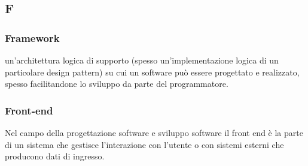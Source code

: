 \subsection*{\textbf{\hfill \Huge{F} \hfill}} 
\subsubsection*{Framework}
un’architettura logica di supporto (spesso un’implementazione logica di un particolare design pattern) su cui un software può essere progettato e realizzato, spesso facilitandone lo sviluppo da parte del programmatore.
\subsubsection*{Front-end}
Nel campo della progettazione software e sviluppo software il front end è la parte di un sistema che gestisce l’interazione con l’utente o con sistemi esterni che producono dati di ingresso.

